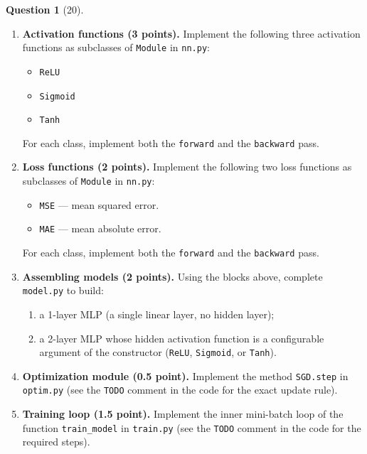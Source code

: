 \documentclass[12pt]{article}
\theoremstyle{definition}
\newtheorem{exercise}{Question}%
\begin{document}
\begin{exercise}[20]
{\begin{enumerate}[label=\textbf{1.1.\arabic*}, leftmargin=*]
    \item \textbf{Activation functions (3 points).} Implement the following three activation functions
    as subclasses of \texttt{Module} in \texttt{nn.py}:
    \begin{itemize}[nosep]
        \item \texttt{ReLU}
        \item \texttt{Sigmoid}
        \item \texttt{Tanh}
    \end{itemize}
    For each class, implement both the \texttt{forward} and the \texttt{backward} pass.

    \item \textbf{Loss functions (2 points).} Implement the following two loss functions as subclasses
    of \texttt{Module} in \texttt{nn.py}:
    \begin{itemize}[nosep]
        \item \texttt{MSE} --- mean squared error.
        \item \texttt{MAE} --- mean absolute error.
    \end{itemize}
    For each class, implement both the \texttt{forward} and the \texttt{backward} pass.

    \item \textbf{Assembling models (2 points).} Using the blocks above, complete \texttt{model.py} to
    build:
    \begin{enumerate}[label=(\alph*), nosep]
        \item a 1-layer MLP (a single linear layer, no hidden layer);
        \item a 2-layer MLP whose hidden activation function is a configurable argument of
        the constructor (\texttt{ReLU}, \texttt{Sigmoid}, or \texttt{Tanh}).
    \end{enumerate}


    \item \textbf{Optimization module (0.5 point).} Implement the method \texttt{SGD.step} in
    \texttt{optim.py} (see the \texttt{TODO} comment in the code for the exact update rule).

    \item \textbf{Training loop (1.5 point).} Implement the inner mini-batch loop of the function
    \texttt{train\_model} in \texttt{train.py} (see the \texttt{TODO} comment in the code for the
    required steps).
    
    
\end{enumerate}



}
\end{exercise}
\end{document}
